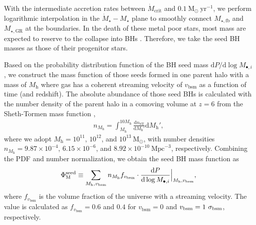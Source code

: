 \documentclass[twocolumn, twocolappendix]{aastex63}
\newcommand{\Msun}{\mathrm{M_\odot}}
\newcommand{\Msunyr}{\mathrm{M_\odot~yr^{-1}}}
\newcommand{\Mh}{M_\mathrm{h}}
\newcommand{\vbsm}{v_\mathrm{bsm}}
\newcommand{\Mdot}{\dot{M}}
\newcommand{\D}{\mathrm{d}}
\newcommand{\red}[1]{\textcolor{red}{ #1}}
\begin{document}
\begin{CJK*}{UTF8}{gbsn}
With the intermediate accretion rates between $\Mdot_\mathrm{crit}$ and $0.1~\Msunyr$, 
we perform logarithmic interpolation in the $\Mdot_\star - M_\star$ plane to smoothly connect 
$M_{\star, \mathrm{fb}}$ and $M_{\star, \mathrm{GR}}$ at the boundaries.
In the death of these metal poor stars, most mass are expected to reserve to the collapse into BHs 
\citep{2003ApJ...591..288H,2010ApJ...714.1217B,2015MNRAS.451.4086S}.
Therefore, we take the seed BH masses as those of their progenitor stars. 

Based on the probability distribution function of the BH seed mass $\D P/ \D \log M_{\bullet, i}$, we construct the mass function of those seeds formed in one parent halo
with a mass of $\Mh$ where gas has a coherent streaming velocity of $\vbsm$ as a function of time (and redshift).
The absolute abundance of those seed BHs is calculated with the number density of the parent halo in a comoving volume at $z=6$ 
from the Sheth-Tormen mass function \citep{2001MNRAS.323....1S},
%
\begin{align}
  n_{\Mh}= \int_{\Mh}^{10\Mh}  \frac{\D n_{\mathrm{ST}}} {\D \Mh'} \D \Mh', 
\end{align}
%
where we adopt $\Mh = 10^{11}$, $10^{12}$, and $10^{13}~\Msun$, 
with number densities $n_{\Mh} = 9.87\times 10^{-4}$, $6.15\times 10^{-6}$, 
and $8.92\times 10^{-10}~ \text{Mpc}^{-3}$, respectively.
Combining the PDF and number normalization, we obtain the seed BH mass function as
%
\begin{align}
\Phi_\mathrm{M}^{\rm seed} \equiv \sum_{\Mh, \vbsm} n_{\Mh} f_{\vbsm} 
\cdot \frac{\D P}{\D \log M_{\bullet, i}}\Big| _{\Mh, \vbsm},
\end{align}
%
where $f_{\vbsm}$ is the volume fraction of the universe with a streaming velocity.
The value is calculated as $f_{\vbsm} = 0.6$ and $0.4$ for $\vbsm = 0$ and $\vbsm=1~\sigma_{\rm bsm}$, respectively. 





\end{CJK*}
\end{document}
